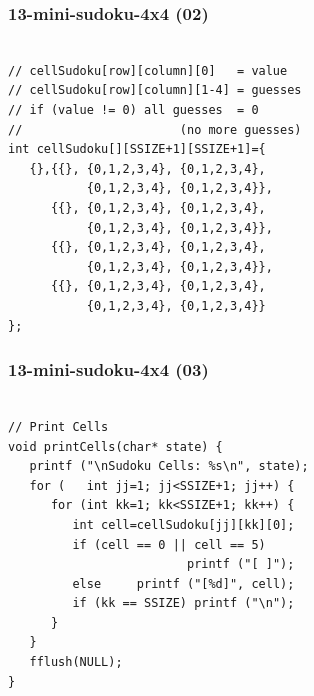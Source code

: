 \documentclass[xcolor=table, notheorems, hyperref={pdfpagelabels=false}]{beamer}
\begin{document}
\begin{frame}[fragile]
\frametitle{13-mini-sudoku-4x4 (02)}
\begin{lstlisting}[basicstyle=\ttfamily\large]        %  54

// cellSudoku[row][column][0]   = value
// cellSudoku[row][column][1-4] = guesses
// if (value != 0) all guesses  = 0 
//                      (no more guesses)
int cellSudoku[][SSIZE+1][SSIZE+1]={
   {},{{}, {0,1,2,3,4}, {0,1,2,3,4}, 
           {0,1,2,3,4}, {0,1,2,3,4}},
      {{}, {0,1,2,3,4}, {0,1,2,3,4}, 
           {0,1,2,3,4}, {0,1,2,3,4}},
      {{}, {0,1,2,3,4}, {0,1,2,3,4},
           {0,1,2,3,4}, {0,1,2,3,4}},
      {{}, {0,1,2,3,4}, {0,1,2,3,4}, 
           {0,1,2,3,4}, {0,1,2,3,4}}
};

\end{lstlisting}
\end{frame}

\begin{frame}[fragile]
\frametitle{13-mini-sudoku-4x4 (03)}
\begin{lstlisting}[basicstyle=\ttfamily\large]        %  54

// Print Cells
void printCells(char* state) {
   printf ("\nSudoku Cells: %s\n", state);
   for (   int jj=1; jj<SSIZE+1; jj++) {
      for (int kk=1; kk<SSIZE+1; kk++) {
         int cell=cellSudoku[jj][kk][0];
         if (cell == 0 || cell == 5) 
                         printf ("[ ]");
         else     printf ("[%d]", cell);
         if (kk == SSIZE) printf ("\n");
      }
   }
   fflush(NULL);
}

\end{lstlisting}
\end{frame}
\end{document}
